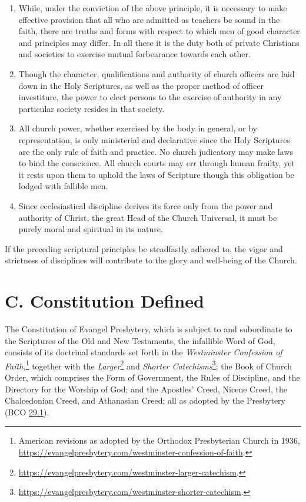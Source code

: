 \documentclass[
]{book}
\begin{document}
\begin{enumerate}
\def\labelenumi{\arabic{enumi}.}
\setcounter{enumi}{4}
\item
  While, under the conviction of the above principle, it is necessary to make effective provision that all who are admitted as teachers be sound in the faith, there are truths and forms with respect to which men of good character and principles may differ. In all these it is the duty both of private Christians and societies to exercise mutual forbearance towards each other.
\item
  Though the character, qualifications and authority of church officers are laid down in the Holy Scriptures, as well as the proper method of officer investiture, the power to elect persons to the exercise of authority in any particular society resides in that society.
\item
  All church power, whether exercised by the body in general, or by representation, is only ministerial and declarative since the Holy Scriptures are the only rule of faith and practice. No church judicatory may make laws to bind the conscience. All church courts may err through human frailty, yet it rests upon them to uphold the laws of Scripture though this obligation be lodged with fallible men.
\item
  Since ecclesiastical discipline derives its force only from the power and authority of Christ, the great Head of the Church Universal, it must be purely moral and spiritual in its nature.
\end{enumerate}

If the preceding scriptural principles be steadfastly adhered to, the vigor and strictness of disciplines will contribute to the glory and well-being of the Church.

\hypertarget{c.-constitution-defined}{%
\section*{C. Constitution Defined}\label{c.-constitution-defined}}

The Constitution of Evangel Presbytery, which is subject to and subordinate to the Scriptures of the Old and New Testaments, the infallible Word of God, consists of its doctrinal standards set forth in the \emph{Westminster Confession of Faith,}\footnote{American revisions as adopted by the Orthodox Presbyterian Church in 1936, \url{https://evangelpresbytery.com/westminster-confession-of-faith}.} together with the \emph{Larger}\footnote{\url{https://evangelpresbytery.com/westminster-larger-catechism}.} and \emph{Shorter Catechisms}\footnote{\url{https://evangelpresbytery.com/westminster-shorter-catechism}.}; the Book of Church Order, which comprises the Form of Government, the Rules of Discipline, and the Directory for the Worship of God; and the Apostles' Creed, Nicene Creed, the Chalcedonian Creed, and Athanasian Creed; all as adopted by the Presbytery (BCO \protect\hyperlink{29.1}{29.1}).
\end{document}
